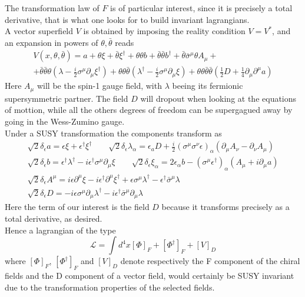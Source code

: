 \documentclass[12pt]{article}
\begin{document}
The transformation law of $F$ is of particular interest, since it is precisely a total derivative, that is what one looks for to build invariant lagrangians. \\
\vspace{15pt}
A vector superfield $V$ is obtained by imposing the reality condition $V=V^*$, and an expansion in powers of $\theta, \bar\theta$ reads
\begin{gather*}
  V\left(x, \theta, \bar\theta\right) = a+\theta \xi+\bar\theta \xi^{\dagger} +\theta \theta b+\bar\theta \bar\theta b^{\dagger}+\bar\theta \bar{\sigma}^{\mu} \theta A_{\mu}+ \\ 
                + \bar\theta \bar\theta \theta\left(\lambda-\frac{i}{2} \sigma^{\mu} \partial_{\mu} \xi^{\dagger}\right)
                +\theta \theta \bar\theta\left(\lambda^{\dagger}-\frac{i}{2} \sigma^{\mu} \partial_{\mu} \xi\right)+\theta \theta \bar\theta \bar\theta \left(\frac{1}{2} D+\frac{1}{4} \partial_{\mu} \partial^{\mu} a\right)
\end{gather*}
Here $A_\mu$ will be the spin-1 gauge field, with $\lambda$ beeing its fermionic supersymmetric partner. The field $D$ will dropout when looking at the equations of mottion, while all the others degrees of freedom can be supergagued away by going in the Wess-Zumino gauge. \\
Under a SUSY transformation the components transform as 
\begin{gather*}
  \sqrt{2} \delta_{\epsilon} a =\epsilon \xi+\epsilon^{\dagger} \xi^{\dagger} \qquad 
  \sqrt{2} \delta_{\epsilon} \lambda_{\alpha} =\epsilon_{a} D+\frac{i}{2}\left(\sigma^{\mu} \sigma^{\nu} \epsilon\right)_{\alpha}\left(\partial_{\mu} A_{\nu}-\partial_{\nu} A_{\mu}\right) \\
  \sqrt{2} \delta_{\epsilon} b =\epsilon^{\dagger} \lambda^{\dagger}-i \epsilon^{\dagger} \sigma^{\mu} \partial_{\mu} \xi \qquad
  \sqrt{2} \delta_{\epsilon} \xi_{\alpha} =2 \epsilon_{\alpha} b-\left(\sigma^{\mu} \epsilon^{\dagger}\right)_{\alpha}\left(A_{\mu}+i \partial_{\mu} a\right) \\
  \sqrt{2} \delta_{\epsilon} A^{\mu} =i \epsilon \partial^{\mu} \xi-i \epsilon^{\dagger} \partial^{\mu} \xi^{\dagger}+\epsilon \sigma^{\mu} \lambda^{\dagger}-\epsilon^{\dagger} \bar{\sigma}^{\mu} \lambda \\
  \boxed{\sqrt{2} \delta_{\epsilon} D =-i \epsilon \sigma^{\mu} \partial_{\mu} \lambda^{\dagger}-i \epsilon^{\dagger} \bar{\sigma}^{\mu} \partial_{\mu} \lambda}
\end{gather*}
Here the term of our interest is the field $D$ because it transforms precisely as a total derivative, as desired. \\
Hence a lagrangian of the type 
\begin{equation*}
  \mathcal{L} = \int d^4x \left[\Phi\right]_F + \left[\Phi^\dagger\right]_F + \left[V\right]_D
\end{equation*}
where $\left[\Phi\right]_F$, $\left[\Phi^\dagger\right]_F$ and $\left[V\right]_D$ denote respectively the F component of the chiral fields and the D component of a vector field, would certainly be SUSY invariant due to the transformation properties of the selected fields. 
\end{document}
